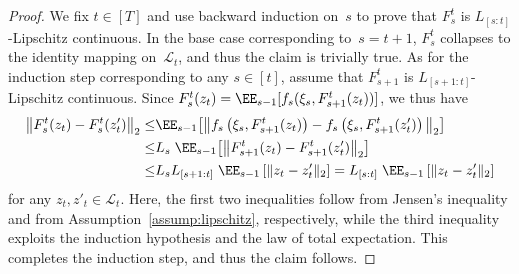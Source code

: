 \documentclass[11pt]{article}
\begin{document}
\begin{proof}
We fix $t\in[T]$ and use backward induction on~$s$ to prove that $F_s^t$ is $L_{[s:t]}$-Lipschitz continuous. In the base case corresponding to~$s=t+1$, $F_s^t$ collapses to the identity mapping on~$\mathcal L_t$, and thus the claim is trivially true. As for the induction step corresponding to any $s\in[t]$, assume that $F_{s+1}^t$ is $L_{[s+1:t]}$-Lipschitz continuous. Since $F_s^t(z_t)=\EE_{s-1}[f_s(\xi_s,F_{s+1}^t(z_t))]$, we thus have
\begin{align*}
   \big\| F_s^t(z_t)- F_s^t(z_t^\prime) \big\|_2 \leq & \EE_{s-1} \big[ \big\| f_s\left(\xi_s,F_{s+1}^t(z_t)\right)-f_s\left(\xi_s,F_{s+1}^t(z_t^\prime)\right) \big\|_2 \big]\\
   \leq  &L_s \; \EE_{s-1} \big[ \big\|F_{s+1}^t(z_t)-F_{s+1}^t(z_t^\prime) \big\|_2 \big] \\
   \leq& L_s L_{[s+1:t]} \; \EE_{s-1} \left[\| z_t-z_t^\prime\|_2\right] = L_{[s:t]} \;\EE_{s-1} \left[ \| z_t-z_t^\prime\|_2 \right]
\end{align*}
for any $z_t,z'_t\in\mathcal L_t$. Here, the first two inequalities follow from Jensen's inequality and from Assumption~\ref{assump:lipschitz}, respectively, while the third inequality exploits the induction hypothesis and the law of total expectation. This completes the induction step, and thus the claim follows.


\end{proof}
\end{document}
